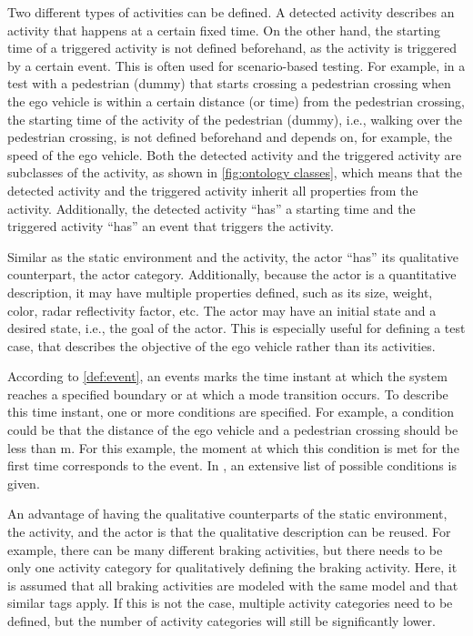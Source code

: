 Two different types of activities can be defined. A detected activity describes an activity that happens at a certain fixed time. On the other hand, the starting time of a triggered activity is not defined beforehand, as the activity is triggered by a certain event. This is often used for scenario-based testing. For example, in a test with a pedestrian (dummy) that starts crossing a pedestrian crossing when the ego vehicle is within a certain distance (or time) from the pedestrian crossing, the starting time of the activity of the pedestrian (dummy), i.e., walking over the pedestrian crossing, is not defined beforehand and depends on, for example, the speed of the ego vehicle. Both the detected activity and the triggered activity are subclasses of the activity, as shown in \cref{fig:ontology classes}, which means that the detected activity and the triggered activity inherit all properties from the activity. Additionally, the detected activity ``has'' a starting time and the triggered activity ``has'' an event that triggers the activity.

Similar as the static environment and the activity, the actor ``has'' its qualitative counterpart, the actor category. Additionally, because the actor is a quantitative description, it may have multiple properties defined, such as its size, weight, color, radar reflectivity factor, etc. The actor may have an initial state and a desired state, i.e., the goal of the actor. This is especially useful for defining a test case, that describes the objective of the ego vehicle rather than its activities.

According to \cref{def:event}, an events marks the time instant at which the system reaches a specified boundary or at which a mode transition occurs. To describe this time instant, one or more conditions are specified. For example, a condition could be that the distance of the ego vehicle and a pedestrian crossing should be less than \unit[30]{m}. For this example, the moment at which this condition is met for the first time corresponds to the event. In \cite{openscenario}, an extensive list of possible conditions is given.

An advantage of having the qualitative counterparts of the static environment, the activity, and the actor is that the qualitative description can be reused. For example, there can be many different braking activities, but there needs to be only one activity category for qualitatively defining the braking activity. Here, it is assumed that all braking activities are modeled with the same model and that similar tags apply. If this is not the case, multiple activity categories need to be defined, but the number of activity categories will still be significantly lower.

